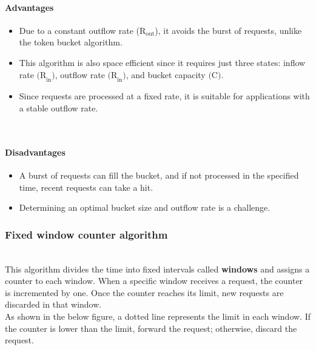 \paragraph{Advantages}\label{PYA2L903Pd2o6LUipvpGF}

\begin{itemize}
\item
\protect{}\label{pP0y6AjjRwwh02OFpOAgy}
Due to a constant outflow rate (\protect{}\label{katex_inline_AFeSwv1cg6PhnQypICaRC}{{{\(\text{R}_\text{{out​}}\)}}}), it avoids the burst of requests, unlike the token bucket algorithm.
\item
\protect{}\label{k_xNe0X_LIHHS7APata7N}
This algorithm is also space efficient since it requires just three states: inflow rate \protect{}\label{katex_inline_Xvc8ZPFL5_b5kVakdHJ6i}{{{\(\text{(R}_\text{{in​}})\)}}}, outflow rate \protect{}\label{katex_inline_rbLOepA_Ls12RwIKT6xEv}{{{\(\text{(R}_\text{{in​}})\)}}}, and bucket capacity \protect{}\label{katex_inline_cN_20aRoTL40mtQK3rglj}{{{\(\text{(C)}\)}}}.
\item
\protect{}\label{kefLGQu5cksFSsqY_Pj1M}
Since requests are processed at a fixed rate, it is suitable for applications with a stable outflow rate.
\end{itemize}
\\
\paragraph{Disadvantages}\label{X8il33JuIhG9WJV_ftkEy}

\begin{itemize}
\item
\protect{}\label{BMDKOzIsXlDoiKV_fGlAz}
A burst of requests can fill the bucket, and if not processed in the specified time, recent requests can take a hit.
\item
\protect{}\label{u_eUp9Sx2fqF_40zRrtcE}
Determining an optimal bucket size and outflow rate is a challenge.
\end{itemize}

\subsubsection{Fixed window counter algorithm}\label{gon2Zrghw-96wFgXvrocm}
\\
This algorithm divides the time into fixed intervals called \textbf{windows} and assigns a counter to each window. When a specific window receives a request, the counter is incremented by one. Once the counter reaches its limit, new requests are discarded in that window.
\\
As shown in the below figure, a dotted line represents the limit in each window. If the counter is lower than the limit, forward the request; otherwise, discard the request.

